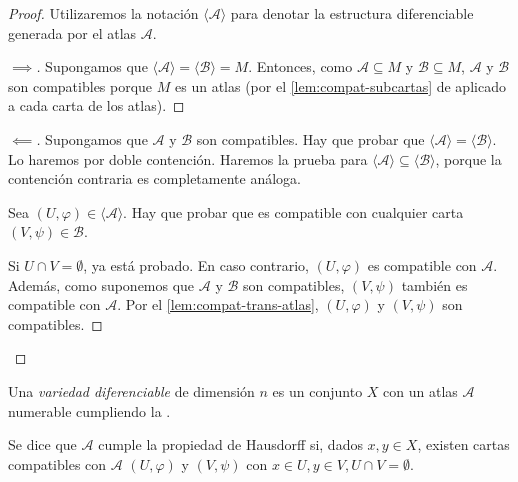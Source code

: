 \documentclass[ebook,oneside]{memoir}
\numberwithin{equation}{chapter}
\newenvironment{subproof}[1][\proofname]{%
  \renewcommand{\qedsymbol}{$\blacksquare$}%
  \begin{proof}[#1]%
}{%
  \end{proof}%
}
\begin{document}
\begin{proof}
  Utilizaremos la notación \(\langle  \mathcal{A} \rangle\) para denotar la estructura
  diferenciable generada por el atlas \(\mathcal{A}\).

  \begin{subproof}[\(\implies\)]
    Supongamos que \(\langle \mathcal{A} \rangle = \langle \mathcal{B} \rangle = M\). Entonces, como
    \(\mathcal{A} \subseteq M\) y \(\mathcal{B} \subseteq M\), \(\mathcal{A}\) y
    \(\mathcal{B}\) son compatibles porque \(M\) es un atlas (por el
    \cref{lem:compat-subcartas} de  aplicado a
    cada carta de los atlas).
  \end{subproof}

  \begin{subproof}[\(\impliedby\)]
    Supongamos que \(\mathcal{A}\) y \(\mathcal{B}\) son compatibles. Hay que
    probar que \(\langle \mathcal{A} \rangle = \langle \mathcal{B} \rangle\). Lo
    haremos por doble contención. Haremos la prueba para \(\langle \mathcal{A}
    \rangle \subseteq \langle \mathcal{B} \rangle\), porque la contención
    contraria es completamente análoga.

    Sea \((U, \varphi) \in
    \langle \mathcal{A} \rangle\). Hay que probar que es compatible con
    cualquier carta \((V,\psi) \in \mathcal{B}\).

      Si \(U \cap V = \emptyset\), ya está probado. En caso contrario,
      \((U,\varphi)\) es compatible con \(\mathcal{A}\). Además, como suponemos
      que \(\mathcal{A}\) y \(\mathcal{B}\) son compatibles, \((V,\psi)\)
      también es compatible con \(\mathcal{A}\). Por el
      \cref{lem:compat-trans-atlas}, \((U,\varphi)\) y \((V,\psi)\) son
      compatibles.
  \end{subproof}
\end{proof}

\begin{definition}
  \label{def:vd}
  Una \emph{variedad diferenciable} de dimensión \(n\) es un conjunto \(X\) con
  un atlas \(\mathcal{A}\) numerable cumpliendo la .

\end{definition}

\begin{definition}
  \label{def:Hausdorff}
  Se dice que \(\mathcal{A}\) cumple la propiedad de Hausdorff si, dados \(x,y
  \in X\), existen cartas compatibles con \(\mathcal{A}\) \((U, \varphi)\) y
  \((V, \psi)\) con \(x \in U, y \in V, U \cap V = \emptyset\).
\end{definition}
\end{document}
